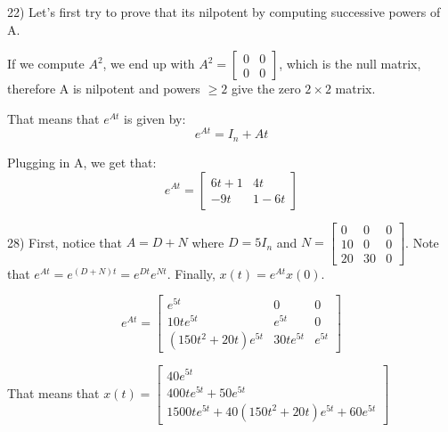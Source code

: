 \documentclass{article}
\begin{document}
22) Let's first try to prove that its nilpotent by computing successive
powers of A.

If we compute $A^2$, we end up with $A^2 = \begin{bmatrix}
    0 & 0 \\
    0 & 0
\end{bmatrix}$, which is the null matrix, therefore
A is nilpotent and powers $\geq 2$ give the zero $2 \times 2$ matrix.

That means that $e^{At}$ is given by:
\[e^{At} = I_n + A t\]

Plugging in A, we get that:
\[e^{At} = \begin{bmatrix}
    6t + 1 & 4t \\
    -9t & 1 - 6t
\end{bmatrix}\]


28) First, notice that $A = D + N$
where $D = 5 I_n$ and $N = \begin{bmatrix}
    0 & 0 & 0 \\
    10 & 0 & 0 \\
    20 & 30 & 0
\end{bmatrix}$.
Note that $e^{At} = e^{(D + N)t} = e^{Dt} e^{Nt}$.
Finally, $x(t) = e^{At} x(0)$.

\[e^{At} = \begin{bmatrix}
    e^{5t} & 0 & 0 \\
    10te^{5t} & e^{5t} & 0 \\
    (150t^2 + 20t)e^{5t} & 30te^{5t} & e^{5t}
\end{bmatrix}\]

That means that $x(t) = \begin{bmatrix}
    40e^{5t} \\
    400te^{5t} + 50e^{5t} \\
    1500te^{5t} + 40(150t^2 + 20t)e^{5t} + 60e^{5t}
\end{bmatrix}$
\end{document}
